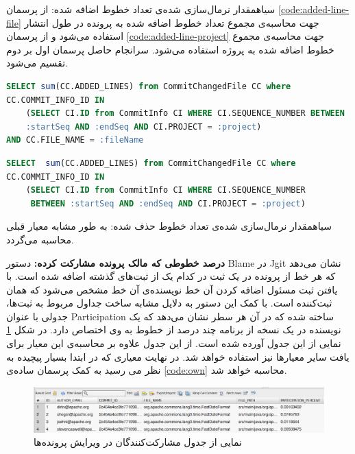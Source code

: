 ‌سیاه{‫مقدار نرمال‌سازی شده‌ی تعداد خطوط اضافه شده:‬}
از پرسمان \ref{code:added-line-file} جهت محاسبه‌ی مجموع تعداد خطوط اضافه شده به پرونده در طول انتشار استفاده می‌شود و از پرسمان \ref{code:added-line-project} جهت محاسبه‌ی مجموع خطوط اضافه شده به پروژه استفاده می‌شود. سرانجام حاصل پرسمان اول بر دوم تقسیم می‌شود. 

\begin{latin}
	\begin{lstlisting}[language=SQL]
SELECT sum(CC.ADDED_LINES) from CommitChangedFile CC where
CC.COMMIT_INFO_ID IN
	(SELECT CI.ID from CommitInfo CI WHERE CI.SEQUENCE_NUMBER BETWEEN 
	:startSeq AND :endSeq AND CI.PROJECT = :project)
AND CC.FILE_NAME = :fileName
	\end{lstlisting}
\end{latin}
\label{code:added-line-file}

\begin{latin}
\begin{lstlisting}[language=SQL]
SELECT  sum(CC.ADDED_LINES) from CommitChangedFile CC where 
CC.COMMIT_INFO_ID IN
	(SELECT CI.ID from CommitInfo CI WHERE CI.SEQUENCE_NUMBER
	 BETWEEN :startSeq AND :endSeq AND CI.PROJECT = :project)
\end{lstlisting}
\end{latin}
\label{code:added-line-project}

‌سیاه{‫مقدار نرمال‌سازی شده‌ی تعداد خطوط حذف شده:‬} به طور مشابه معیار قبلی محاسبه می‌گردد.

\textbf{درصد خطوطی که مالک پرونده مشارکت کرده:}
دستور Blame در Jgit نشان می‌دهد که هر خط از پرونده در یک ثبت  در کدام یک از ثبت‌های گذشته اضافه شده است.  با یافتن ثبت مسئول اضافه کردن آن خط نویسنده‌ی آن خط مشخص می‌شود که همان ثبت‌کننده است. با کمک این دستور به دلایل مشابه ساخت جداول مربوط به ثبت‌ها، جدولی با عنوان Participation ساخته شده که در آن هر سطر نشان می‌دهد که یک نویسنده در یک نسخه از برنامه چند درصد از خطوط به وی اختصاص دارد. در شکل \ref{fig:participation} نمایی از این جدول آورده شده است.  از این جدول علاوه بر محاسبه‌ی این معیار برای یافت سایر معیارها نیز استفاده خواهد شد. در نهایت معیاری که در ابتدا بسیار پیچیده به نظر می رسید به کمک پرسمان ساده‌ی \ref{code:own} محاسبه خواهد شد. 

\begin{figure}[H]
	\centering
	\includegraphics[width=1\textwidth]{img/case_study/participation.png}
	\caption{نمایی از جدول مشارکت‌کنندگان در ویرایش پرونده‌ها}
	\label{fig:participation}
\end{figure}



